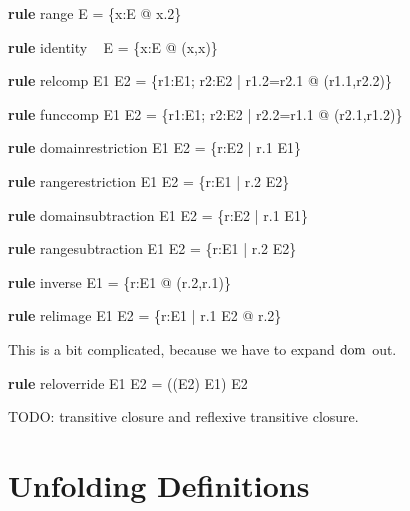 \documentclass{article}
\newenvironment{zedrule}[1]{\par\textbf{rule }#1\vspace{-1ex}\infrule}{\endinfrule}
\begin{document}
\begin{zedrule}{range}
   \ran E = \{x:E @ x.2\}
\end{zedrule}

\begin{zedrule}{identity}
   \id ~ E = \{x:E @ (x,x)\}
\end{zedrule}

\begin{zedrule}{relcomp}
   E1 \semi E2 = \{r1:E1; r2:E2 | r1.2=r2.1 @ (r1.1,r2.2)\}
\end{zedrule}

\begin{zedrule}{funccomp}
   E1 \semi E2 = \{r1:E1; r2:E2 | r2.2=r1.1 @ (r2.1,r1.2)\}
\end{zedrule}

\begin{zedrule}{domainrestriction}
   E1 \dres E2 = \{r:E2 | r.1 \in E1\}
\end{zedrule}

\begin{zedrule}{rangerestriction}
   E1 \rres E2 = \{r:E1 | r.2 \in E2\}
\end{zedrule}

\begin{zedrule}{domainsubtraction}
   E1 \ndres E2 = \{r:E2 | r.1 \notin E1\}
\end{zedrule}\mapsto

\begin{zedrule}{rangesubtraction}
   E1 \nrres E2 = \{r:E1 | r.2 \notin E2\}
\end{zedrule}

\begin{zedrule}{inverse}
   E1 \inv = \{r:E1 @ (r.2,r.1)\}
\end{zedrule}

\begin{zedrule}{relimage}
   E1 \limg E2 \rimg = \{r:E1 | r.1 \in E2 @ r.2\}
\end{zedrule}

This is a bit complicated, because we have to expand $\mathop{\mathstrut{\mbox{\textrm{dom}}}}\nolimits$ out.
\begin{zedrule}{reloverride}
   E1 \oplus E2 = ((\dom E2) \ndres E1) \cup E2
\end{zedrule}

TODO: transitive closure and reflexive transitive closure.


\section{Unfolding Definitions}
\end{document}
